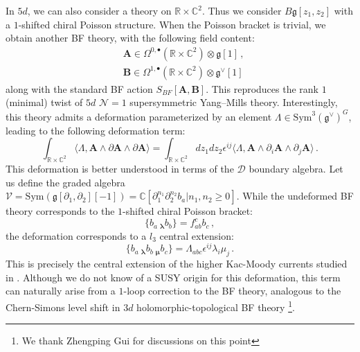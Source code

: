 \documentclass[11pt]{article}
\newcommand{\C}{\mathbb{C}}
\newcommand{\R}{\mathbb{R}}
\numberwithin{equation}{section}
\begin{document}
 In $5d$, we can also consider a theory on $\R\times\C^2$. Thus we consider $B\mathfrak{g}[z_1,z_2]$ with a $1$-shifted chiral Poisson structure. When the Poisson bracket is trivial, we obtain another BF theory, with the following field content:
  \begin{equation}
	\begin{aligned}
		&\boldsymbol{A} \in \Omega^{0,\bullet}(\R\times\C^2)\otimes \mathfrak{g}[1]\,,\\
		&\boldsymbol{B} \in \Omega^{1,\bullet}(\R\times\C^2)\otimes \mathfrak{g}^{\vee}[1]
	\end{aligned}
\end{equation}
along with the standard BF action $S_{BF}[\boldsymbol{A},\boldsymbol{B}]$. This reproduces the rank $1$ (minimal) twist of $5d$ $\mathcal{N} = 1$ supersymmetric Yang--Mills theory. Interestingly, this theory admits a deformation parameterized by an element $\Lambda \in \mathrm{Sym}^3(\mathfrak{g}^{\vee})^G$, leading to the following deformation term:
\begin{equation}
	\int_{\R\times\C^2}\langle \Lambda,  \boldsymbol{A}\wedge\partial\boldsymbol{A}\wedge\partial\boldsymbol{A} \rangle = \int_{\R\times\C^2}dz_1dz_2\epsilon^{ij}\langle \Lambda,  \boldsymbol{A}\wedge\partial_i\boldsymbol{A}\wedge\partial_j\boldsymbol{A} \rangle\,.
\end{equation}
This deformation is better understood in terms of the $\mathcal{D}$ boundary algebra. Let us define the graded algebra $\mathcal{V} = \mathrm{Sym}(\mathfrak{g}[\partial_1,\partial_2][-1]) = \C[\partial_1^{n_1}\partial_2^{n_2}b_a|n_1,n_2 \ge 0]$. While the undeformed BF theory corresponds to the $1$-shifted chiral Poisson bracket:
\begin{equation}
\{b_{a}~\!_{\boldsymbol{\lambda}} b_b\} = f_{ab}^cb_c\,,
\end{equation}
the deformation corresponds to a $l_3$ central extension:
\begin{equation}
\{b_{a}~\!_{\boldsymbol{\lambda}}b_{b}~\!_{\boldsymbol{\mu}}b_c\} = \Lambda_{abc}\epsilon^{ij}\lambda_{i}\mu_j\,.
\end{equation}
This is precisely the central extension of the higher Kac-Moody currents studied in \cite{faonte2019higher,gwilliam2018higher}. Although we do not know of a SUSY origin for this deformation, this term can naturally arise from a $1$-loop correction to the BF theory, analogous to the Chern-Simons level shift in $3d$ holomorphic-topological BF theory \footnote{We thank Zhengping Gui for discussions on this point}.
\end{document}
